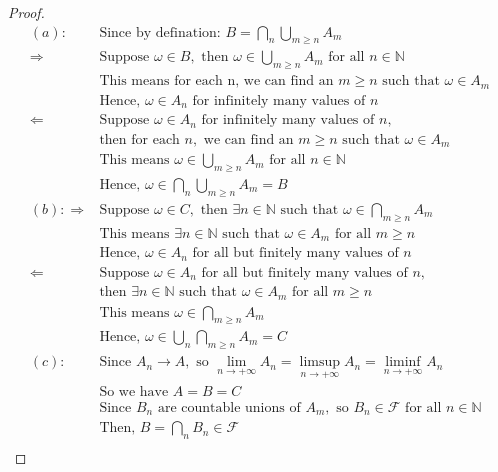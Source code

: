 \documentclass[letterpaper, 11pt]{article}
\newcommand{\1}{\mathds{1}}	%
\theoremstyle{definition}
\begin{document}
\begin{proof}
  \begin{align*}{}{}
  (a):&\text{Since by defination: } B = \bigcap_{n} \bigcup_{m \geq n} A_{m} \\
  \Rightarrow&\text{Suppose } \omega \in B, \text{ then } \omega \in \bigcup_{m \geq n} A_{m} \text{ for all } n \in \mathbb{N} \\
  &\text{This means for each n, we can find an }m\geq n \text{ such that } \omega \in A_{m} \\
  &\text{Hence, } \omega \in A_{n} \text{ for infinitely many values of } n \\
  \Leftarrow&\text{Suppose } \omega \in A_{n} \text{ for infinitely many values of } n, \\
  &\text{then for each } n, \text{ we can find an } m\geq n \text{ such that } \omega \in A_{m} \\
  &\text{This means } \omega \in \bigcup_{m \geq n} A_{m} \text{ for all } n \in \mathbb{N} \\
  &\text{Hence, } \omega \in \bigcap_{n} \bigcup_{m \geq n} A_{m} = B \\
  (b): \Rightarrow&\text{Suppose } \omega \in C, \text{ then }\exists n \in \mathbb{N} \text{ such that }\omega \in \bigcap_{m \geq n} A_{m} \\
  &\text{This means }\exists n \in \mathbb{N} \text{ such that }\omega \in A_{m} \text{ for all } m \geq n \\
  &\text{Hence, }\omega \in A_{n} \text{ for all but finitely many values of } n \\
  \Leftarrow&\text{Suppose }\omega \in A_{n} \text{ for all but finitely many values of } n, \\
  &\text{then }\exists n \in \mathbb{N} \text{ such that }\omega \in A_{m} \text{ for all } m \geq n \\
  &\text{This means }\omega \in \bigcap_{m \geq n} A_{m} \\
  &\text{Hence, }\omega \in \bigcup_{n} \bigcap_{m \geq n} A_{m} = C \\
  (c):&\text{Since } A_n \rightarrow A, \text{ so } \lim_{n\rightarrow+\infty}A_n=\limsup_{n\rightarrow+\infty}A_n=\liminf_{n\rightarrow+\infty}A_n\\
  &\text{So we have } A=B=C\\
  &\text{Since } B_n \text{ are countable unions of } A_m, \text{ so } B_n \in \mathcal{F} \text{ for all } n \in \mathbb{N} \\
  &\text{Then, } B = \bigcap_n B_n \in \mathcal{F} \\

\end{align*}
\end{proof}
\end{document}
